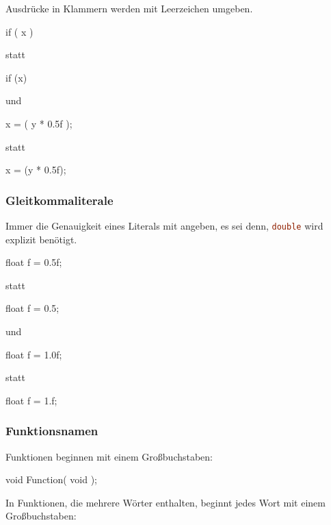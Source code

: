 \documentclass{homework-pp}
\renewcommand{\c}[1]{\lstinline[language=c,basicstyle=\ttfamily]|#1|}
\begin{document}
Ausdrücke in Klammern werden mit Leerzeichen umgeben.

\begin{cblock}
if ( x ) {

}
\end{cblock}

statt

\begin{cblock}
if (x) {

}
\end{cblock}

und

\begin{cblock}
x = ( y * 0.5f );
\end{cblock}

statt

\begin{cblock}
x = (y * 0.5f);
\end{cblock}

\subsubsection{Gleitkommaliterale}

Immer die Genauigkeit eines Literals mit angeben, es sei denn, \c{double} wird explizit benötigt.

\begin{cblock}
float f = 0.5f;
\end{cblock}
statt
\begin{cblock}
float f = 0.5;
\end{cblock}

und

\begin{cblock}
float f = 1.0f;
\end{cblock}
statt
\begin{cblock}
float f = 1.f;
\end{cblock}

\subsubsection{Funktionsnamen}

Funktionen beginnen mit einem Großbuchstaben:

\begin{cblock}
void Function( void );
\end{cblock}

In Funktionen, die mehrere Wörter enthalten, beginnt jedes Wort mit einem Großbuchstaben:
\end{document}
